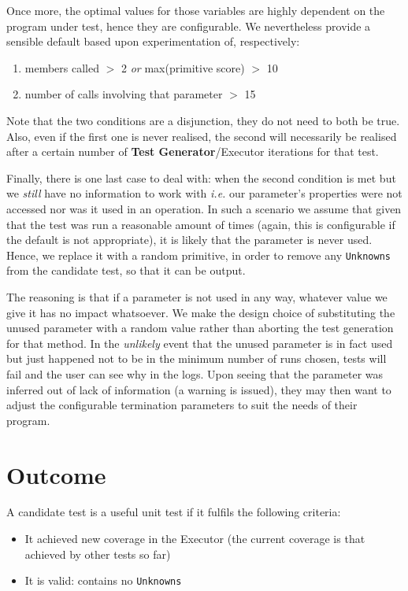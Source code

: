 Once more, the optimal values for those variables are highly dependent on the program under test, hence they are configurable. We nevertheless provide a sensible default based upon experimentation of, respectively:

\begin{enumerate}
   \item members called \(>\) 2 \emph{or} max(primitive score) \(>\) 10
   \item number of calls involving that parameter \(>\) 15
\end{enumerate}

Note that the two conditions are a disjunction, they do not need to both be true. Also, even if the first one is never realised, the second will necessarily be realised after a certain number of \textbf{Test Generator}/\textsf{Executor} iterations for that test.

Finally, there is one last case to deal with: when the second condition is met but we \emph{still} have no information to work with \emph{i.e.} our parameter's properties were not accessed nor was it used in an operation. In such a scenario we assume that given that the test was run a reasonable amount of times (again, this is configurable if the default is not appropriate), it is likely that the parameter is never used. Hence, we replace it with a random primitive, in order to remove any \texttt{Unknowns} from the candidate test, so that it can be output.

The reasoning is that if a parameter is not used in any way, whatever value we give it has no impact whatsoever. We make the design choice of substituting the unused parameter with a random value rather than aborting the test generation for that method. In the \emph{unlikely} event that the unused parameter is in fact used but just happened not to be in the minimum number of runs chosen, tests will fail and the user can see why in the logs. Upon seeing that the parameter was inferred out of lack of information (a warning is issued), they may then want to adjust the configurable termination parameters to suit the needs of their program.

\section{Outcome}

A candidate test is a useful unit test if it fulfils the following criteria:

\begin{itemize}
   \item It achieved new coverage in the \textsf{Executor} (the current coverage is that achieved by other tests so far)
   \item It is valid: contains no \texttt{Unknowns}
\end{itemize}

